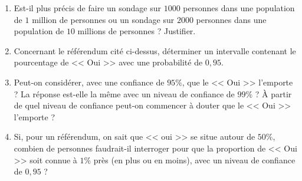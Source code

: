 \titre{  }
\auteur{}



\begin{enumerate}
	\item Est-il plus précis de faire un sondage sur $1000$ personnes dans une population de $1$ million de personnes ou un sondage sur $2000$ personnes dans une population de $10$ millions de personnes ? Justifier.
	\item Concernant le référendum cité ci-dessus, déterminer un intervalle contenant le pourcentage de << Oui >> avec une probabilité de $0{,}95$.
	\item Peut-on considérer, avec une confiance de $95\%$, que le << Oui >> l'emporte ? La réponse est-elle
	la même avec un niveau de confiance de $99\%$ ? \`A partir de quel niveau de confiance peut-on commencer à douter que le << Oui >> l'emporte ?
	\item Si, pour un référendum, on sait que << oui >> se situe autour de $50\%$, combien de personnes
	faudrait-il interroger pour que la proportion de << Oui >> soit connue à $1\%$ près (en plus ou en
	moins), avec un niveau de confiance de $0{,}95$ ?
\end{enumerate}